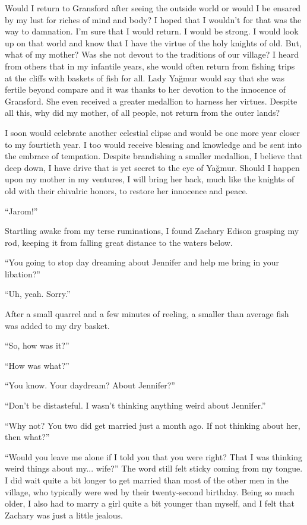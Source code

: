 Would I return to Gransford after seeing the outside world or would I be ensared by my lust for
riches of mind and body? I hoped that I wouldn't for that was the way to damnation. I'm sure that I
would return. I would be strong. I would look up on that world and know that I have the virtue of
the holy knights of old. But, what of my mother? Was she not devout to the traditions of our
village? I heard from others that in my infantile years, she would often return from fishing trips
at the cliffs with baskets of fish for all. Lady Yağmur would say that she was fertile beyond
compare and it was thanks to her devotion to the innocence of Gransford. She even received a greater
medallion to harness her virtues. Despite all this, why did my mother, of all people, not return
from the outer lands?

I soon would celebrate another celestial elipse and would be one more year closer to my fourtieth
year. I too would receive blessing and knowledge and be sent into the embrace of tempation. Despite
brandishing a smaller medallion, I believe that deep down, I have drive that is yet secret to the
eye of Yağmur. Should I happen upon my mother in my ventures, I will bring her back, much like the
knights of old with their chivalric honors, to restore her innocence and peace.

``Jarom!''

Startling awake from my terse ruminations, I found Zachary Edison grasping my rod, keeping it from
falling great distance to the waters below.

``You going to stop day dreaming about Jennifer and help me bring in your libation?''

``Uh, yeah. Sorry.''

After a small quarrel and a few minutes of reeling, a smaller than average fish was added to my dry
basket.

``So, how was it?''

``How was what?''

``You know. Your daydream? About Jennifer?''

``Don't be distasteful. I wasn't thinking anything weird about Jennifer.''

``Why not? You two did get married just a month ago. If not thinking about her, then what?''

``Would you leave me alone if I told you that you were right? That I was thinking weird things about
my... wife?'' The word still felt sticky coming from my tongue. I did wait quite a bit longer to get
married than most of the other men in the village, who typically were wed by their twenty-second
birthday. Being so much older, I also had to marry a girl quite a bit younger than myself, and I
felt that Zachary was just a little jealous.

